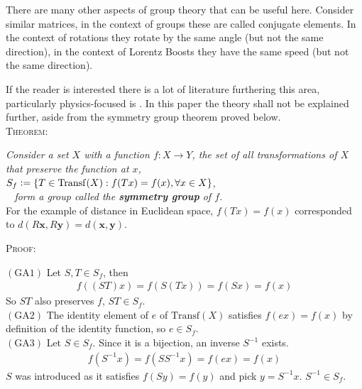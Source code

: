  There are many other aspects of group theory that can be useful here. Consider similar matrices, in the context of groups these are called conjugate elements. In the context of rotations they rotate by the same angle (but not the same direction), in the context of Lorentz Boosts they have the same speed (but not the same direction).
 
 If the reader is interested there is a lot of literature furthering this area, particularly physics-focused is \cite{SCPV3}. In this paper the theory shall not be explained further, aside from the symmetry group theorem proved below.
\vspace{2mm} \\
\textsc{Theorem:}

{\centering \textit{Consider a set $X$ with a function $f:X\rightarrow Y$, the set of all transformations of $X$ that preserve the function at $x$,\\
$S_f\vcentcolon =\{ T \in \mathrm{Transf}(X) : f(Tx)=f(x), \forall x \in X \}$,\\
$\phantom{a}$ \hspace{48mm} form a group called the \textbf{symmetry group} of $f$.}}
\vspace{2mm} \\

For the example of distance in Euclidean space, $f(Tx)=f(x)$ corresponded to $d(R\mathbf{x},R\mathbf{y}) = d(\mathbf{x},\mathbf{y})$.

\begin{flushleft}\textsc{Proof:} \end{flushleft}

$(\mathrm{GA}1)$ Let $S,T\in S_f$, then
\begin{align*}
f((ST)x)=f(S(Tx))= f(Sx) = f(x)
\end{align*}
So $ST$ also preserves $f$, $ST \in S_f$. \\

$(\mathrm{GA}2)$ The identity element of $e$ of $\mathrm{Transf}(X)$ satisfies $f(ex)=f(x)$ by definition of the identity function, so $e \in S_f$.\\

$(\mathrm{GA}3)$ Let $S \in S_f$. Since it is a bijection, an inverse $S^{-1}$ exists.
\begin{align*}
f(S^{-1}x) = f(SS^{-1}x)= f(ex)= f(x)
\end{align*}
$S$ was introduced as it satisfies $f(Sy)=f(y)$ and pick $y=S^{-1}x$. $S^{-1} \in S_f$.\\

